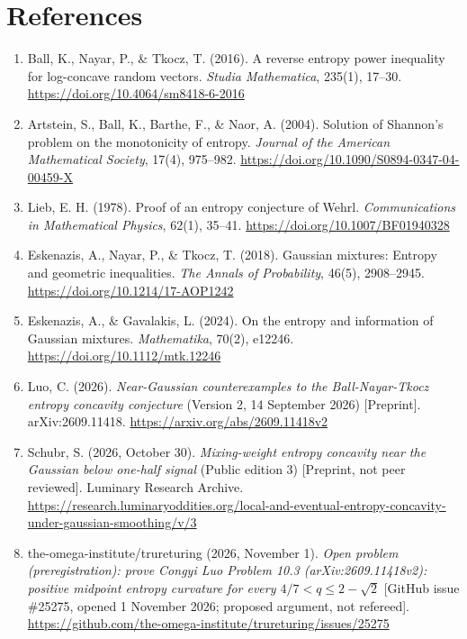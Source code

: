 \documentclass[
  british,
  10pt,
]{article}
\begin{document}
\section{References}\label{references}

\begin{enumerate}
\def\labelenumi{\arabic{enumi}.}
\item
  Ball, K., Nayar, P., \& Tkocz, T. (2016). A reverse entropy power
  inequality for log-concave random vectors. \emph{Studia Mathematica},
  235(1), 17--30. \url{https://doi.org/10.4064/sm8418-6-2016}
\item
  Artstein, S., Ball, K., Barthe, F., \& Naor, A. (2004). Solution of
  Shannon's problem on the monotonicity of entropy. \emph{Journal of the
  American Mathematical Society}, 17(4), 975--982.
  \url{https://doi.org/10.1090/S0894-0347-04-00459-X}
\item
  Lieb, E. H. (1978). Proof of an entropy conjecture of Wehrl.
  \emph{Communications in Mathematical Physics}, 62(1), 35--41.
  \url{https://doi.org/10.1007/BF01940328}
\item
  Eskenazis, A., Nayar, P., \& Tkocz, T. (2018). Gaussian mixtures:
  Entropy and geometric inequalities. \emph{The Annals of Probability},
  46(5), 2908--2945. \url{https://doi.org/10.1214/17-AOP1242}
\item
  Eskenazis, A., \& Gavalakis, L. (2024). On the entropy and information
  of Gaussian mixtures. \emph{Mathematika}, 70(2), e12246.
  \url{https://doi.org/10.1112/mtk.12246}
\item
  Luo, C. (2026). \emph{Near-Gaussian counterexamples to the
  Ball-Nayar-Tkocz entropy concavity conjecture} (Version 2, 14
  September 2026) {[}Preprint{]}. arXiv:2609.11418.
  \url{https://arxiv.org/abs/2609.11418v2}
\item
  Schubr, S. (2026, October 30). \emph{Mixing-weight entropy concavity
  near the Gaussian below one-half signal} (Public edition 3)
  {[}Preprint, not peer reviewed{]}. Luminary Research Archive.
  \url{https://research.luminaryoddities.org/local-and-eventual-entropy-concavity-under-gaussian-smoothing/v/3}
\item
  the-omega-institute/trureturing (2026, November 1). \emph{Open problem
  (preregistration): prove Congyi Luo Problem 10.3 (arXiv:2609.11418v2):
  positive midpoint entropy curvature for every \(4/7<q\le2-\sqrt2\)}
  {[}GitHub issue \#25275, opened 1 November 2026; proposed argument,
  not refereed{]}.
  \url{https://github.com/the-omega-institute/trureturing/issues/25275}

\end{enumerate}
\end{document}

